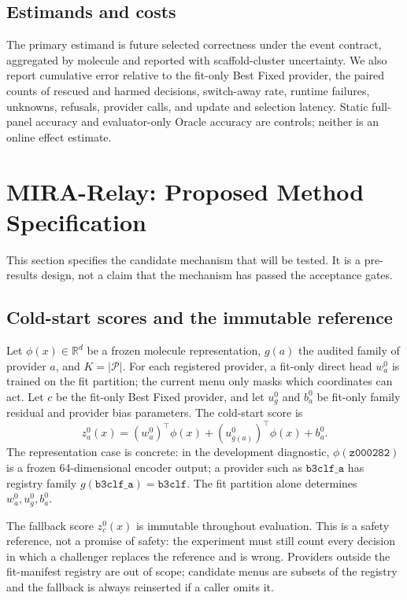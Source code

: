 \documentclass[sigconf,anonymous]{aamas}
\begin{document}
\subsection{Estimands and costs}
The primary estimand is future selected correctness under the event contract, aggregated by molecule and reported with scaffold-cluster uncertainty. We also report cumulative error relative to the fit-only Best Fixed provider, the paired counts of rescued and harmed decisions, switch-away rate, runtime failures, unknowns, refusals, provider calls, and update and selection latency. Static full-panel accuracy and evaluator-only Oracle accuracy are controls; neither is an online effect estimate.

\section{MIRA-Relay: Proposed Method Specification}
This section specifies the candidate mechanism that will be tested. It is a pre-results design, not a claim that the mechanism has passed the acceptance gates.

\subsection{Cold-start scores and the immutable reference}
Let $\phi(x)\in\mathbb{R}^{d}$ be a frozen molecule representation, $g(a)$ the audited family of provider $a$, and $K=|\mathcal P|$. For each registered provider, a fit-only direct head $w_a^0$ is trained on the fit partition; the current menu only masks which coordinates can act. Let $c$ be the fit-only Best Fixed provider, and let $u_g^0$ and $b_a^0$ be fit-only family residual and provider bias parameters. The cold-start score is
$$
z_a^0(x)=(w_a^0)^\top\phi(x)+(u_{g(a)}^0)^\top\phi(x)+b_a^0.
$$
The representation case is concrete: in the development diagnostic, $\phi(\texttt{z000282})$ is a frozen 64-dimensional encoder output; a provider such as $\texttt{b3clf\_a}$ has registry family $g(\texttt{b3clf\_a})=\texttt{b3clf}$. The fit partition alone determines $w_a^0,u_g^0,b_a^0$.

The fallback score $z_c^0(x)$ is immutable throughout evaluation. This is a safety reference, not a promise of safety: the experiment must still count every decision in which a challenger replaces the reference and is wrong. Providers outside the fit-manifest registry are out of scope; candidate menus are subsets of the registry and the fallback is always reinserted if a caller omits it.
\end{document}
